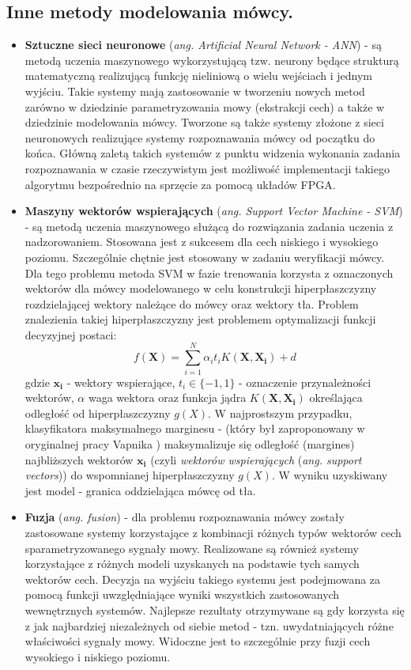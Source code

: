 \subsection{Inne metody modelowania mówcy.}
\begin{itemize}
  \item{\textbf{Sztuczne sieci neuronowe} (\textit{ang. Artificial Neural Network - ANN})} - są metodą uczenia maszynowego wykorzystującą tzw. neurony będące strukturą matematyczną realizującą funkcję nieliniową o wielu wejściach i jednym wyjściu. Takie systemy mają zastosowanie w tworzeniu nowych metod zarówno w dziedzinie parametryzowania mowy (ekstrakcji cech) a także w dziedzinie modelowania mówcy. Tworzone są także systemy złożone z sieci neuronowych realizujące systemy rozpoznawania mówcy od początku do końca. Główną zaletą takich systemów z punktu widzenia wykonania zadania rozpoznawania w czasie rzeczywistym jest możliwość implementacji takiego algorytmu bezpośrednio na sprzęcie za pomocą układów FPGA.
  \item{\textbf{Maszyny wektorów wspierających} (\textit{ang. Support Vector Machine - SVM}) \label{svm}} - są metodą uczenia maszynowego służącą do rozwiązania zadania uczenia z nadzorowaniem. Stosowana jest z sukcesem dla cech niskiego i wysokiego poziomu. Szczególnie chętnie jest stosowany w zadaniu weryfikacji mówcy. Dla tego problemu metoda SVM w fazie trenowania korzysta z oznaczonych wektorów dla mówcy modelowanego w celu konstrukcji hiperpłaszczyzny rozdzielającej wektory należące do mówcy oraz wektory tła. Problem znalezienia takiej hiperpłaszczyzny jest problemem optymalizacji funkcji decyzyjnej postaci:
\begin{equation}
  f(\bm{X}) =\sum^N_{i=1}\alpha_it_iK(\bm{X},\bm{X_i}) + d
\end{equation}
    gdzie $\bm{x_i}$ - wektory wspierające, $t_i \in \{-1,1\}$ - oznaczenie przynależności wektorów, $\alpha$ waga wektora oraz funkcja jądra $K(\bm{X},\bm{X_i})$ określająca odległość od hiperpłaszczyzny $g(X)$.
    W najprostszym przypadku, klasyfikatora maksymalnego marginesu - (który był zaproponowany w oryginalnej pracy Vapnika \cite{vapniksvm}) maksymalizuje się odległość (margines) najbliższych wektorów $\bm{x_i}$ (czyli \textit{wektorów wspierających}  (\textit{ang. support vectors})) do wspomnianej hiperpłaszczyzny  $g(X)$. W wyniku uzyskiwany jest model - granica oddzielająca mówcę od tła.
  \item{\textbf{Fuzja} (\textit{ang. fusion})} - dla problemu rozpoznawania mówcy zostały zastosowane systemy korzystające z kombinacji różnych typów wektorów cech sparametryzowanego sygnały mowy. Realizowane są również systemy korzystające z różnych modeli uzyskanych na podstawie tych samych wektorów cech. Decyzja na wyjściu takiego systemu jest podejmowana za pomocą funkcji uwzględniające wyniki wszystkich zastosowanych wewnętrznych systemów. Najlepsze rezultaty otrzymywane są gdy korzysta się z jak najbardziej niezależnych od siebie metod - tzn. uwydatniających różne właściwości sygnały mowy. Widoczne jest to szczególnie przy fuzji cech wysokiego i niskiego poziomu.
\end{itemize}

